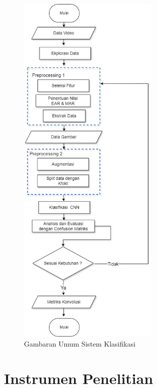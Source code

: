     \begin{figure}[H]
      \centering
      \includegraphics[width=0.6\textwidth]{figures/bab3/flowchart.jpg}
      \caption{Gambaran Umum Sistem Klasifikasi}
      \label{flowchart}
      \medskip %
      \begin{minipage}{0.8\textwidth}
        \centering

      \end{minipage}
    \end{figure}


    

\section{Instrumen Penelitian}

